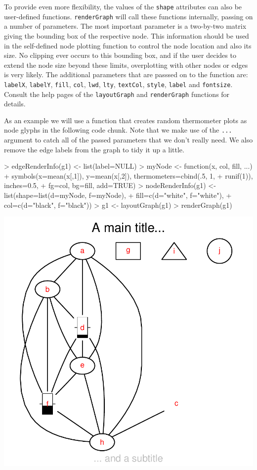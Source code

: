\documentclass{article}
\newcommand{\Rfunction}[1]{{\texttt{#1}}}
\newcommand{\Robject}[1]{{\texttt{#1}}}
\begin{document}
To provide even more flexibility, the values of the \Robject{shape}
attributes can also be user-defined functions. \Rfunction{renderGraph}
will call these functions internally, passing on a number of
parameters. The most important parameter is a two-by-two matrix giving
the bounding box of the respective node. This information should be
used in the self-defined node plotting function to control the node
location and also its size. No clipping ever occurs to this bounding
box, and if the user decides to extend the node size beyond these
limits, overplotting with other nodes or edges is very likely. The
additional parameters that are passsed on to the function are:
\Robject{labelX}, \Robject{labelY}, \Robject{fill}, \Robject{col},
\Robject{lwd}, \Robject{lty}, \Robject{textCol}, \Robject{style},
\Robject{label} and \Robject{fontsize}. Consult the help pages of the
\Rfunction{layoutGraph} and \Rfunction{renderGraph} functions for
details.

As an example we will use a function that creates random thermometer
plots as node glyphs in the following code chunk. Note that we make
use of the \Robject{...} argument to catch all of the passed
parameters that we don't really need. We also remove the edge labels
from the graph to tidy it up a little.
\begin{Schunk}
\begin{Sinput}
> edgeRenderInfo(g1) <- list(label=NULL)
> myNode <- function(x, col, fill, ...)
+ symbols(x=mean(x[,1]), y=mean(x[,2]), thermometers=cbind(.5, 1,
+ runif(1)), inches=0.5,
+ fg=col, bg=fill, add=TRUE)
> nodeRenderInfo(g1) <- list(shape=list(d=myNode, f=myNode), 
+                            fill=c(d="white", f="white"),
+                            col=c(d="black", f="black"))
> g1 <- layoutGraph(g1)
> renderGraph(g1)
\end{Sinput}
\end{Schunk}
\includegraphics{newRgraphvizInterface-userDefinedNode}
\end{document}
